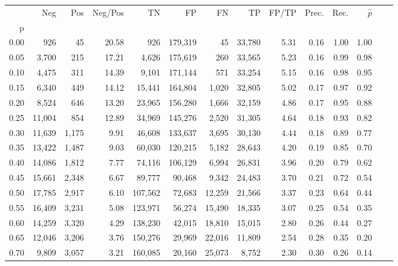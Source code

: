 \begin{tabular}{rrrrrrrrrrrrrr}
\toprule
{} &     Neg &    Pos & Neg/Pos &       TN &       FP &      FN &      TP & FP/TP & Prec. &  Rec. & $\hat{p}$ \\
p    &         &        &         &          &          &         &         &       &       &       &           \\
\midrule
0.00 &     926 &     45 &   20.58 &      926 &  179,319 &      45 &  33,780 &  5.31 &  0.16 &  1.00 &      1.00 \\
0.05 &   3,700 &    215 &   17.21 &    4,626 &  175,619 &     260 &  33,565 &  5.23 &  0.16 &  0.99 &      0.98 \\
0.10 &   4,475 &    311 &   14.39 &    9,101 &  171,144 &     571 &  33,254 &  5.15 &  0.16 &  0.98 &      0.95 \\
0.15 &   6,340 &    449 &   14.12 &   15,441 &  164,804 &   1,020 &  32,805 &  5.02 &  0.17 &  0.97 &      0.92 \\
0.20 &   8,524 &    646 &   13.20 &   23,965 &  156,280 &   1,666 &  32,159 &  4.86 &  0.17 &  0.95 &      0.88 \\
0.25 &  11,004 &    854 &   12.89 &   34,969 &  145,276 &   2,520 &  31,305 &  4.64 &  0.18 &  0.93 &      0.82 \\
0.30 &  11,639 &  1,175 &    9.91 &   46,608 &  133,637 &   3,695 &  30,130 &  4.44 &  0.18 &  0.89 &      0.77 \\
0.35 &  13,422 &  1,487 &    9.03 &   60,030 &  120,215 &   5,182 &  28,643 &  4.20 &  0.19 &  0.85 &      0.70 \\
0.40 &  14,086 &  1,812 &    7.77 &   74,116 &  106,129 &   6,994 &  26,831 &  3.96 &  0.20 &  0.79 &      0.62 \\
0.45 &  15,661 &  2,348 &    6.67 &   89,777 &   90,468 &   9,342 &  24,483 &  3.70 &  0.21 &  0.72 &      0.54 \\
0.50 &  17,785 &  2,917 &    6.10 &  107,562 &   72,683 &  12,259 &  21,566 &  3.37 &  0.23 &  0.64 &      0.44 \\
0.55 &  16,409 &  3,231 &    5.08 &  123,971 &   56,274 &  15,490 &  18,335 &  3.07 &  0.25 &  0.54 &      0.35 \\
0.60 &  14,259 &  3,320 &    4.29 &  138,230 &   42,015 &  18,810 &  15,015 &  2.80 &  0.26 &  0.44 &      0.27 \\
0.65 &  12,046 &  3,206 &    3.76 &  150,276 &   29,969 &  22,016 &  11,809 &  2.54 &  0.28 &  0.35 &      0.20 \\
0.70 &   9,809 &  3,057 &    3.21 &  160,085 &   20,160 &  25,073 &   8,752 &  2.30 &  0.30 &  0.26 &      0.14 \\

\end{tabular}

